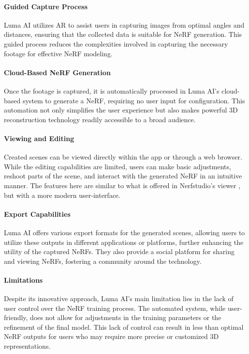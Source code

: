 \paragraph{Guided Capture Process}
Luma AI utilizes AR to assist users in capturing images from optimal angles and distances, ensuring that the collected data is suitable for NeRF generation.
This guided process reduces the complexities involved in capturing the necessary footage for effective NeRF modeling.

\paragraph{Cloud-Based NeRF Generation}
Once the footage is captured, it is automatically processed in Luma AI’s cloud-based system to generate a NeRF, requiring no user input for configuration.
This automation not only simplifies the user experience but also makes powerful 3D reconstruction technology readily accessible to a broad audience.

\paragraph{Viewing and Editing}
Created scenes can be viewed directly within the app or through a web browser. 
While the editing capabilities are limited, users can make basic adjustments, reshoot parts of the scene, and interact with the generated NeRF in an intuitive manner.
The features here are similar to what is offered in Nerfstudio's viewer , but with a more modern user-interface.

\paragraph{Export Capabilities}
Luma AI offers various export formats for the generated scenes, allowing users to utilize these outputs in different applications or platforms, further enhancing the utility of the captured NeRFs.
They also provide a social platform for sharing and viewing NeRFs, fostering a community around the technology.

\paragraph{Limitations}
Despite its innovative approach, Luma AI's main limitation lies in the lack of user control over the NeRF training process. 
The automated system, while user-friendly, does not allow for adjustments in the training parameters or the refinement of the final model. 
This lack of control can result in less than optimal NeRF outputs for users who may require more precise or customized 3D representations.

